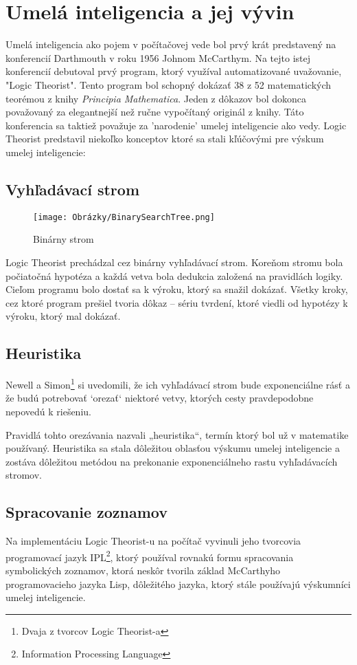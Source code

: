 \chapter{Umelá inteligencia a jej vývin}
Umelá inteligencia ako pojem v počítačovej vede bol prvý krát predstavený na konferencií Darthmouth v roku 1956 Johnom McCarthym. Na tejto istej konferencií debutoval prvý program, ktorý využíval automatizované uvažovanie, "Logic Theorist". Tento program bol schopný dokázať 38 z 52 matematických teorémou z knihy \textit{Principia Mathematica}. Jeden z dôkazov bol dokonca považovaný za elegantnejší než ručne vypočítaný originál z knihy\cite{Corduck}. Táto konferencia sa taktiež považuje za 'narodenie' umelej inteligencie ako vedy. Logic Theorist predstavil niekoľko konceptov ktoré sa stali kľúčovými pre výskum umelej inteligencie:
\section{Vyhľadávací strom}
\begin{wrapfigure}{r}{0.20\textwidth} %
    \centering
    \vspace{-30pt}
    \texttt{[image: Obrázky/BinarySearchTree.png]}
    \caption{Binárny strom}
\end{wrapfigure} 
Logic Theorist prechádzal cez binárny vyhľadávací strom.
Koreňom stromu bola počiatočná hypotéza a každá vetva bola dedukcia založená na pravidlách logiky. Cieľom programu bolo dostať sa k výroku, ktorý sa snažil dokázať. Všetky kroky, cez ktoré program prešiel tvoria dôkaz – sériu tvrdení, ktoré viedli od hypotézy k výroku, ktorý mal dokázať\cite{Corduck}.
\section{Heuristika}  
Newell a Simon\footnote{Dvaja z tvorcov Logic Theorist-a} si uvedomili, že ich vyhľadávací strom bude exponenciálne rásť a že budú potrebovať ‘orezať‘ niektoré vetvy, ktorých cesty pravdepodobne nepovedú k riešeniu. 

Pravidlá tohto orezávania nazvali „heuristika“, termín ktorý bol už v matematike používaný. Heuristika sa stala dôležitou oblasťou výskumu umelej inteligencie a zostáva dôležitou metódou na prekonanie exponenciálneho rastu vyhľadávacích stromov.
\section{Spracovanie zoznamov}
Na implementáciu Logic Theorist-u na počítač vyvinuli jeho tvorcovia programovací jazyk IPL\footnote{Information Processing Language}, ktorý používal rovnakú formu spracovania symbolických zoznamov, ktorá neskôr tvorila základ McCarthyho programovacieho jazyka Lisp, dôležitého jazyka, ktorý stále používajú výskumníci umelej inteligencie\cite{Corduck}.
